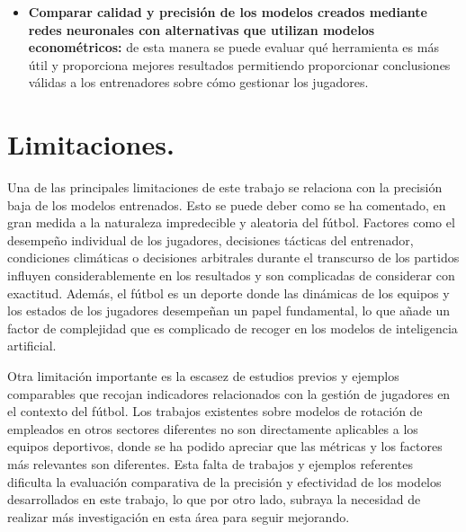 \begin{itemize}
    \item \textbf{Comparar calidad y precisión de los modelos creados mediante redes neuronales con alternativas que utilizan modelos econométricos:} de esta manera se puede evaluar qué herramienta es más útil y proporciona mejores resultados permitiendo proporcionar conclusiones válidas a los entrenadores sobre cómo gestionar los jugadores.
\end{itemize}



\section{Limitaciones.}

Una de las principales limitaciones de este trabajo se relaciona con la precisión baja de los modelos entrenados. Esto se puede deber como se ha comentado, en gran medida a la naturaleza impredecible y aleatoria del fútbol. Factores como el desempeño individual de los jugadores, decisiones tácticas del entrenador, condiciones climáticas o decisiones arbitrales durante el transcurso de los partidos influyen considerablemente en los resultados y son complicadas de considerar con exactitud. Además, el fútbol es un deporte donde las dinámicas de los equipos y los estados de los jugadores desempeñan un papel fundamental, lo que añade un factor de complejidad que es complicado de recoger en los modelos de inteligencia artificial.

Otra limitación importante es la escasez de estudios previos y ejemplos comparables que recojan indicadores relacionados con la gestión de jugadores en el contexto del fútbol. Los trabajos existentes sobre modelos de rotación de empleados en otros sectores diferentes no son directamente aplicables a los equipos deportivos, donde se ha podido apreciar que las métricas y los factores más relevantes son diferentes. Esta falta de trabajos y ejemplos referentes dificulta la evaluación comparativa de la precisión y efectividad de los modelos desarrollados en este trabajo, lo que por otro lado, subraya la necesidad de realizar más investigación en esta área para seguir mejorando.